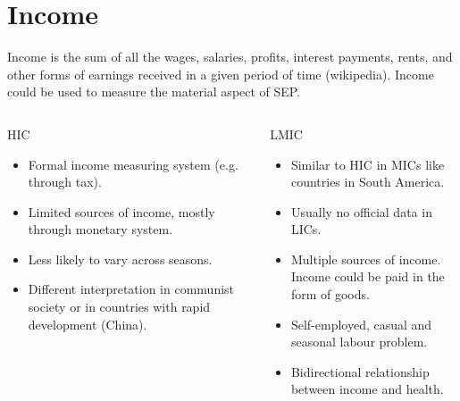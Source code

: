 \documentclass[13pt]{beamer}
\begin{document}
\section{Income}
\begin{frame}
	Income is the sum of all the wages, salaries, profits, interest payments, rents, and other forms of earnings received in a given period of time (wikipedia). Income could be used to measure the material aspect of SEP.
	\begin{columns}
		\begin{column}{0.45\textwidth}
			\begin{block}{HIC}
				\begin{minipage}[c][0.65\textheight][c]{\linewidth}
					\begin{itemize}
					\item Formal income measuring system (e.g. through tax).
					\item Limited sources of income, mostly through monetary system.
					\item Less likely to vary across seasons.
					\item Different interpretation in communist society or in countries with rapid development (China).
					\end{itemize}
				\end{minipage}
			\end{block}
		\end{column}
		\begin{column}{0.45\textwidth}
				\begin{block}{LMIC}
					\begin{minipage}[c][0.65\textheight][c]{\linewidth}
						\begin{itemize}
					\item Similar to HIC in MICs like countries in South America.
					\item Usually no official data in LICs.
					\item Multiple sources of income. Income could be paid in the form of goods.
					\item Self-employed, casual and seasonal labour problem.
					\item Bidirectional relationship between income and health.
						\end{itemize}
					\end{minipage}
				\end{block}
		\end{column}
	\end{columns}
\end{frame}
\end{document}

